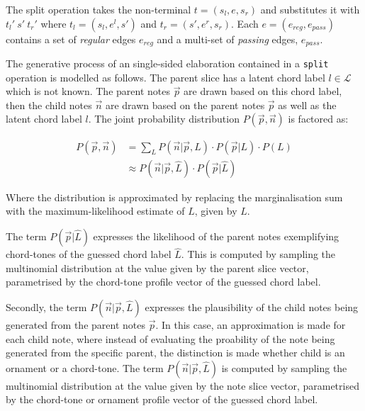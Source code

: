 \documentclass[12pt,a4paper,twoside,openany]{report} \usepackage[pdfborder={0 0 0}]{hyperref}    %
\theoremstyle{definition} \newtheorem{definition}{Definition}[section]
\begin{document}
    The split operation takes the non-terminal $t = (s_l, e, s_r)$ and substitutes it with $t_l'~ s' ~ t_r'$ where $t_l
    = (s_l, e^{l}, s')$ and $t_r = (s', e^{r}, s_r)$. Each $e = (e_{reg}, e_{pass})$ contains a set of \textit{regular}
    edges $e_{reg}$ and a multi-set of  \textit{passing} edges, $e_{pass}$.

    The generative process of an single-sided elaboration contained in a \texttt{split} operation is modelled as follows. The parent
    slice has a latent chord label $l \in \mathcal{L}$ which is not known. The parent notes $\vec{p}$ are drawn based on this chord label, then the
    child notes $\vec{n}$ are drawn based on the parent notes $\vec{p}$ as well as the latent chord label $l$. The
    joint probability distribution $P(\vec{p},\vec{n})$ is factored as:

    \begin{equation}
      \begin{aligned}
        P(\vec{p},\vec{n}) &= \sum\limits_L P(\vec{n}| \vec{p}, L)\cdot P(\vec{p} | L) \cdot P(L)\\
                           &\approx P(\vec{n}| \vec{p}, \hat{L})\cdot P(\vec{p} | \hat{L}) 
      \end{aligned}
    \end{equation}

    Where the distribution is approximated by replacing the marginalisation sum with the maximum-likelihood estimate of
    $L$, given by $\hat{L}$. 

    
    The term $P(\vec{p} | \hat{L})$ expresses the likelihood of the parent notes exemplifying chord-tones of the
    guessed chord label $\hat{L}$. 
    This is computed by sampling the multinomial distribution at the value given by the parent slice vector,
    parametrised by the chord-tone profile vector of the guessed chord label.

    Secondly, the term $P(\vec{n}| \vec{p} , \hat{L})$ expresses the plausibility of the child notes being
    generated from the parent notes $\vec{p}$. In this case, an approximation is made for each child note, where
    instead of evaluating the proability of the note being generated from the specific parent, the distinction
    is made whether child is an ornament or a chord-tone. 
    The term $P(\vec{n}| \vec{p} , \hat{L})$ is computed by sampling the multinomial distribution at the value
    given by the note slice vector,
    parametrised by the chord-tone or ornament profile vector of the guessed chord label.
\end{document}
